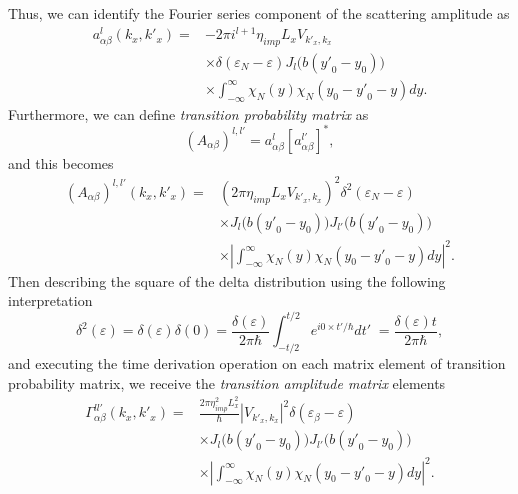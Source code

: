 \documentclass[
 reprint,
 amsmath,amssymb,
 aps,
 prb,
]{revtex4-2}
\begin{document}
\begin{appendix}
Thus, we can identify the Fourier series component of the scattering amplitude as
\begin{equation} \label{eq:c36}
  \begin{aligned}
    a^l_{\alpha\beta}(k_x,k'_x) = &
    -2\pi i^{l+1}
    \eta_{imp} L_x V_{{k'}_x,k_x}\\
    & \times
    \delta(\varepsilon_{N} - \varepsilon)
    J_l\bm{(}b({y'}_0 - y_0)\bm{)}\\
    & \times
    \int_{-\infty}^{\infty}
    {\chi}_N(y)
    {\chi}_N(y_0 - {y'}_0 - y) dy.
  \end{aligned}
\end{equation}
Furthermore, we can define \textit{transition probability matrix} as
\begin{equation} \label{eq:c37}
    \left(A_{\alpha\beta} \right)^{l,l'} =
    a^l_{\alpha\beta}\left[a^{l'}_{\alpha\beta} \right]^{*},
\end{equation}
and this becomes
\begin{equation} \label{eq:c38}
  \begin{aligned}
      \left(A_{\alpha\beta} \right)^{l,l'}(k_x,k'_x) = &
      \left({ 2 \pi \eta_{imp} L_x V_{{k'}_x,k_x}}\right)^2
      \delta^2(\varepsilon_{N} - \varepsilon) \\
      & \times
      J_l\bm{(}b({y'}_0 - y_0)\bm{)} J_{l'}\bm{(}b({y'}_0 - y_0)\bm{)}\\
      & \times
      \left|
      \int_{-\infty}^{\infty}
      {\chi}_N(y)
      {\chi}_N(y_0 - {y'}_0 - y) dy \right|^2.
  \end{aligned}
\end{equation}
Then describing the square of the delta distribution using the following interpretation \cite{dini16,kibis14}
\begin{equation} \label{eq:c39}
    \delta^2(\varepsilon) =
    \delta(\varepsilon)\delta(0) =
    \frac{\delta(\varepsilon)}{2\pi \hbar}
    \int_{-t/2}^{t/2} e^{i0\times t'/\hbar} dt'\; =
    \frac{\delta(\varepsilon)t}{2\pi \hbar},
\end{equation}
and executing the time derivation operation on each matrix element of transition probability matrix, we receive the \textit{transition amplitude matrix} elements
\begin{equation} \label{eq:40}
  \begin{aligned}
    \Gamma_{\alpha\beta}^{ll'}(k_x,k'_x) = &
    \frac { 2\pi \eta_{imp}^2 L_x^2}{ \hbar} |V_{{k'}_x,k_x}|^2
    \delta(\varepsilon_{\beta} - \varepsilon)\\
    & \times
    J_l\bm{(}b({y'}_0 - y_0)\bm{)} J_{l'}\bm{(}b({y'}_0 - y_0)\bm{)} \\
    & \times
    \left|
    \int_{-\infty}^{\infty}
    {\chi}_N(y)
    {\chi}_N(y_0 - {y'}_0 - y) dy \right|^2.
  \end{aligned}
\end{equation}


\end{appendix}
\end{document}
